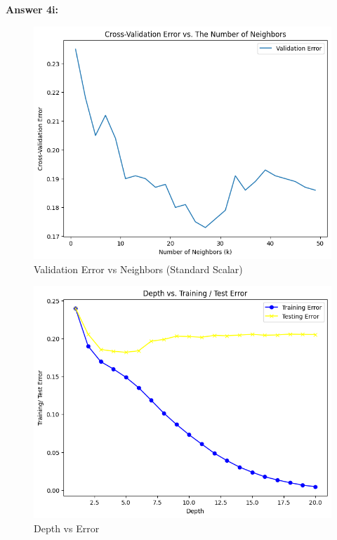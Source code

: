\documentclass[10pt]{article}
\begin{document}
\begin{flushleft}

\textbf{Answer 4i:}

\begin{figure}[H]
\centering
\includegraphics[width=1\textwidth]{images/val_error_vs_neighbors.png}
\caption{Validation Error vs Neighbors (Standard Scalar)}
\label{fig:Training}
\end{figure}

\begin{figure}[H]
\centering
\includegraphics[width=1\textwidth]{images/depth_vs_error.png}
\caption{Depth vs Error}
\label{fig:Training}
\end{figure}


\end{flushleft}
\end{document}
